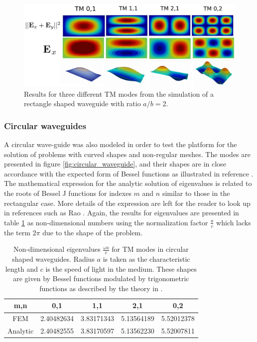 \begin{figure}
\centering
\includegraphics[scale=0.1]{./img/rectangular_waveguide.pdf}
\caption{Results for three different TM modes from the simulation of a rectangle shaped waveguide with ratio $a/b=2$.}
\label{fig:rectangular_waveguide}
\end{figure}


\subsubsection{Circular waveguides}

A circular wave-guide was also modeled in order to test the platform for the solution of problems with curved shapes and non-regular meshes. The modes are presented in figure \ref{fig:circular_waveguide}, and their shapes are in close accordance with the expected form of Bessel functions as illustrated in reference \cite{Soto2009}. The mathematical expression for the analytic solution of eigenvalues is related to the roots of Bessel J functions for indexes $m$ and $n$ similar to those in the rectangular case. More details of the expression are left for the reader to look up in references such as Rao \cite{Rao2004}. 
Again, the results for eigenvalues are presented in table \ref{tab:cir_wav_comparison} as non-dimensional numbers using the normalization factor $\frac{a}{c}$ which lacks the term $2\pi$ due to the shape of the problem.
\begin{table}
\begin{center}
\begin{tabular}{|c|c|c|c|c|}
\hline 
m,n & 0,1 & 1,1 & 2,1 & 0,2 \\ 
\hline 
FEM     & 2.40482634 & 3.83171343 & 5.13564189 & 5.52012378 \\ 
\hline 
Analytic & 2.40482555 & 3.83170597 & 5.13562230 & 5.52007811 \\ 
\hline 
\end{tabular} 
\caption{Non-dimensional eigenvalues $\frac{\omega a}{c}$ for TM modes in circular shaped waveguides. Radius $a$ is taken as the characteristic length and $c$ is the speed of light in the medium. These shapes are given by Bessel functions modulated by trigonometric functions as described by the theory in \cite{Rao2004}.}
\label{tab:cir_wav_comparison}
\end{center}
\end{table}

